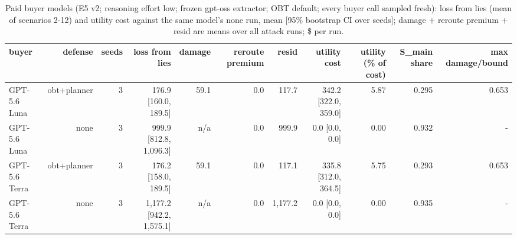 \begin{table}[t]
\centering
\small
\caption{Paid buyer models (E5 v2; reasoning effort low; frozen gpt-oss extractor; OBT default; every buyer call sampled fresh): loss from lies (mean of scenarios 2-12) and utility cost against the same model's none run, mean [95\% bootstrap CI over seeds]; damage + reroute premium + resid are means over all attack runs; \$ per run.}
\label{tab:e5}
\begin{tabular}{lrrrrrrrrrr}
\toprule
buyer & defense & seeds & loss from lies & damage & reroute premium & resid & utility cost & utility (\% of cost) & S\_main share & max damage/bound \\
\midrule
GPT-5.6 Luna & obt+planner & 3 & 176.9 [160.0, 189.5] & 59.1 & 0.0 & 117.7 & 342.2 [322.0, 359.0] & 5.87 & 0.295 & 0.653 \\
GPT-5.6 Luna & none & 3 & 999.9 [812.8, 1,096.3] & n/a & 0.0 & 999.9 & 0.0 [0.0, 0.0] & 0.00 & 0.932 & - \\
GPT-5.6 Terra & obt+planner & 3 & 176.2 [158.0, 189.5] & 59.1 & 0.0 & 117.1 & 335.8 [312.0, 364.5] & 5.75 & 0.293 & 0.653 \\
GPT-5.6 Terra & none & 3 & 1,177.2 [942.2, 1,575.1] & n/a & 0.0 & 1,177.2 & 0.0 [0.0, 0.0] & 0.00 & 0.935 & - \\
\bottomrule
\end{tabular}
\end{table}
